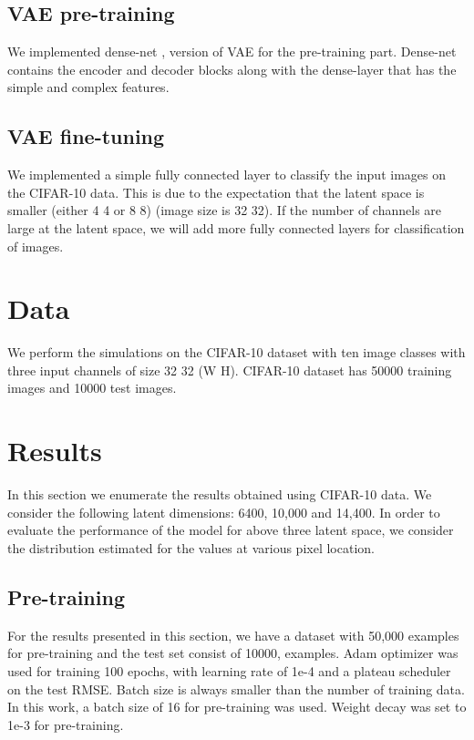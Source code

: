 \documentclass[sigconf, authorversion]{acmart}
\begin{document}
\subsection{VAE pre-training}
We implemented dense-net \cite{huang2017densely},\cite{ zhang2018poisson} version of VAE for the pre-training part. Dense-net contains the encoder and decoder blocks along with the dense-layer that has the simple and complex features.

\subsection{VAE fine-tuning}
We implemented a simple fully connected layer to classify the input images on the CIFAR-10 \cite{krizhevsky2009learning} data. This is due to the expectation that the latent space is smaller (either 4  4 or 8  8) (image size is 32  32). If the number of channels are large at the latent space, we will add more fully connected layers for classification of images.

\section{Data}
We perform the simulations on the CIFAR-10 dataset with ten image classes with three input channels  of size 32  32 (W  H). CIFAR-10 dataset has 50000 training images and 10000 test images. 
\section{Results}
In this section we enumerate the results obtained using CIFAR-10 data. We consider the following latent dimensions: 6400, 10,000 and 14,400. In order to evaluate the performance of the model for above three latent space, we consider the distribution estimated for the values at various pixel location. 
\subsection{Pre-training}
For the results presented in this section, we have a dataset with 50,000   examples for pre-training and the test set consist of 10000,  examples. Adam optimizer was used for training 100 epochs, with learning rate of 1e-4 and a plateau scheduler on the test RMSE. Batch size is always smaller than the number of training data. In this work, a batch size of 16 for pre-training was used. Weight decay was set to 1e-3 for pre-training.
\\
\end{document}
